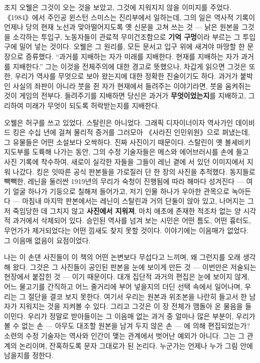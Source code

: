 조지 오웰은 그것이 오는 것을 보았고, 그것에 지워지지 않을 이미지를 주었다. 《1984》에서 주인공 윈스턴 스미스는 진리부에서 일하는데, 그의 일은 역사적 기록이 언제나 당의 현재 노선과 맞아떨어지도록 옛 신문을 고쳐 쓰는 것 — 낡은 원본을 그것을 소각하는 투입구, 노동자들이 관료적 무미건조함으로 \textbf{기억 구멍}이라 부르는 그 투입구에 밀어 넣는 것이다. 오웰은 그 원리를, 모든 문서고 입구 위에 새겨야 마땅할 한 문장으로 증류했다. ``과거를 지배하는 자가 미래를 지배한다. 현재를 지배하는 자가 과거를 지배한다.'' 그는 이것을 전체주의에 대한 경고로 뜻했으나, 차갑게 읽으면 그것은 또한, 우리가 역사를 무엇으로 보아 왔는지에 대한 정확한 진술이기도 하다. 과거가 붙박인 사실의 좌판이 아니라 붓을 쥔 자가 현재에서 들려주는 이야기라면, 붓을 움켜쥐는 것이 게임의 전부다. 들려주기를 지배하면 당신은 과거가 \textbf{무엇이었는지}를 지배하고, 그리하여 미래가 무엇이 되도록 허락받는지를 지배한다.

오웰은 허구를 쓰고 있었다. 스탈린은 아니었다. 그래픽 디자이너이자 역사가인 데이비드 킹은 수십 년에 걸쳐 물리적 증거를 그러모아 《사라진 인민위원》으로 펴냈는데, 그 유물들은 어떤 소설보다 오싹하다. 진짜 사진이기 때문이다. 스탈린이 옛 볼셰비키 지도부를 도륙해 나가는 동안, 그의 수정 기술자들은 메스와 에어브러시를 손에 들고 사진 기록에 착수하여, 새로이 실각한 자들을 그들이 레닌 곁에 서 있던 이미지에서 지워 나갔다. 킹은 잇따른 공식 판본들을 가로질러 단 한 장의 사진을 추적했다. 동지들로 빽빽한, 레닌을 둘러싼 1919년의 무리가 숙청이 진행됨에 따라 해마다 성겨진다 — 여기 얼굴 하나가 기둥으로 칠해져 들어가고, 저기 인물 하나가 우아한 관목으로 녹아든다 — 마침내 마지막 판본에서는 레닌이 스탈린과 거의 단둘이 앉아 있고, 나머지는 그저 죽임당한 데 그치지 않고 \textbf{사진에서 지워져}, 마치 애초에 존재한 적조차 없는 양 시각적 과거에서 삭제되어 있다. 승인된 역사를 넘겨 보는 시민은 어떤 틈도, 어떤 흉터도, 무언가가 제거되었다는 어떤 낌새도 찾지 못할 것이다. 이야기에는 이음매가 없었다. 그 이음매 없음이 요점이었다.

나는 이 손댄 사진들이 이 책의 어떤 논변보다 무섭다고 느끼며, 왜 그런지를 오래 생각해 왔다. 그것은 그 사진들이 공인된 판본을 눈에 보이게 만든 것 — 이번만은 저술되는 현장에서 붙잡힌 것 — 이기 때문이다. 대개 집단적 과거의 편집은 눈에 보이지 않게, 어느 물고기를 간직하고 어느 줄거리에 부어 넣을지의 더딘 선택 속에서 일어나며, 우리는 그 절단을 결코 보지 못한다. 여기서 우리는 원본과 위조본을 나란히 들고서 한 남자가 지워지는 것을 지켜볼 수 있다. 그리고 그것은 이 장 전체가 맴돌아 온 물음을 들이민다. 우리가 정말로 받아들이는 그 이음매 없는 과거 중 얼마나 많은 부분이, 우리가 볼 수 없는 손 — 아무도 대조할 원본을 남겨 두지 않은 손 — 에 의해 편집되었는가? 소련의 수정 기술자는 역사와 인간이 맺는 관계에서 벗어난 예외가 아니다. 그는 그 관계의 논리이며, 잔혹하도록 문자 그대로가 된 논리다. 누군가는 언제나 누가 그림 안에 남을지를 정한다.

